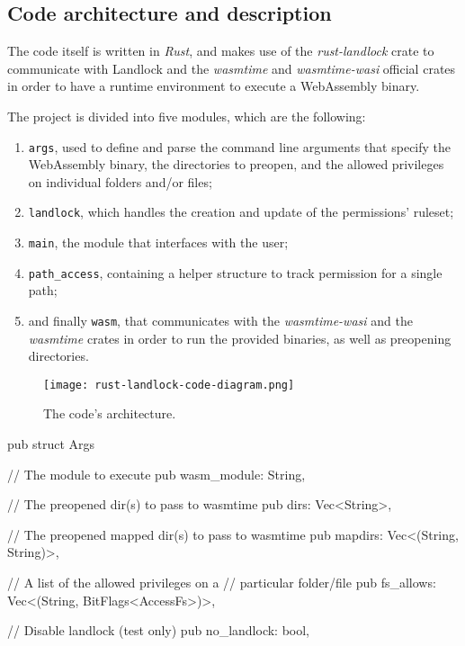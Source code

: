 \subsection{Code architecture and description}\label{sec:landlock-code-architecture}

The code itself is written in \textit{Rust}, and makes use of the
\textit{rust-landlock} \cite{rust-landlock} crate
to communicate with Landlock and the \textit{wasmtime} and \textit{wasmtime-wasi} official
crates in order to have a runtime environment to execute a WebAssembly binary.

The project is divided into five modules, which are the following:
\begin{enumerate}
  \item \texttt{args}, used to define and parse the command line arguments that specify the WebAssembly binary,
        the directories to preopen, and the allowed privileges on individual folders and/or files;
  \item \texttt{landlock}, which handles the creation and update of the permissions' ruleset;
  \item \texttt{main}, the module that interfaces with the user;
  \item \texttt{path\_access}, containing a helper structure to track permission for a single path;
  \item and finally \texttt{wasm}, that communicates with the \textit{wasmtime-wasi} and the \textit{wasmtime} crates
        in order to run the provided binaries, as well as preopening directories.
\end{enumerate}

\begin{figure}[ht]
  \centering
  \texttt{[image: rust-landlock-code-diagram.png]}
  \caption{The code's architecture.}
  \label{fig:rust-landlock-code-architecture}
\end{figure}

\begin{code}[language=rust, caption=The \texttt{Args} struct., label=lst:arg-struct]
  pub struct Args {
    // The module to execute
    pub wasm_module: String,
  
    // The preopened dir(s) to pass to wasmtime
    pub dirs: Vec<String>,
  
    // The preopened mapped dir(s) to pass to wasmtime
    pub mapdirs: Vec<(String, String)>,
  
    // A list of the allowed privileges on a
    // particular folder/file
    pub fs_allows: Vec<(String, BitFlags<AccessFs>)>,
  
    // Disable landlock (test only)
    pub no_landlock: bool,
  }
  \end{code}

